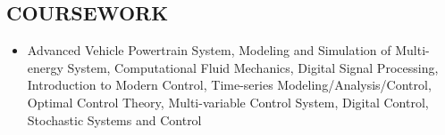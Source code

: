 \documentclass[margin, 9pt]{res} %
\begin{document}
\begin{resume}

\section{COURSEWORK}

\vspace*{-1pt}
\begin{itemize}[leftmargin=*] \itemsep -2pt
	\item Advanced Vehicle Powertrain System, Modeling and Simulation of Multi-energy System, Computational Fluid Mechanics, Digital Signal Processing, Introduction to Modern Control, Time-series Modeling/Analysis/Control, Optimal Control Theory, Multi-variable Control System, Digital Control, Stochastic Systems and Control
\end{itemize}


\end{resume}
\end{document}
